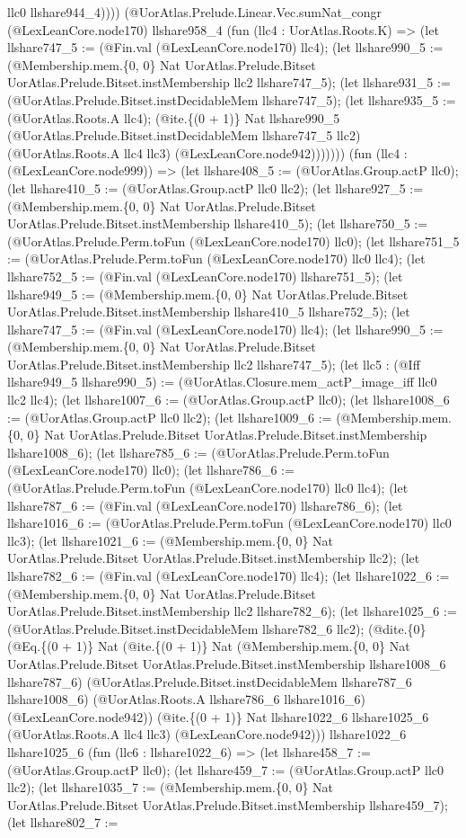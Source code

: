 \documentclass[11pt]{article}
\begin{document}
llc0 llshare944\_4)))) (@UorAtlas.Prelude.Linear.Vec.sumNat\_congr (@LexLeanCore.node170) llshare958\_4 (fun (llc4 : UorAtlas.Roots.K) => (let llshare747\_5 := (@Fin.val (@LexLeanCore.node170) llc4); (let llshare990\_5 := (@Membership.mem.\{0, 0\} Nat UorAtlas.Prelude.Bitset UorAtlas.Prelude.Bitset.instMembership llc2 llshare747\_5); (let llshare931\_5 := (@UorAtlas.Prelude.Bitset.instDecidableMem llshare747\_5); (let llshare935\_5 := (@UorAtlas.Roots.A llc4); (@ite.\{(0 + 1)\} Nat llshare990\_5 (@UorAtlas.Prelude.Bitset.instDecidableMem llshare747\_5 llc2) (@UorAtlas.Roots.A llc4 llc3) (@LexLeanCore.node942))))))) (fun (llc4 : (@LexLeanCore.node999)) => (let llshare408\_5 := (@UorAtlas.Group.actP llc0); (let llshare410\_5 := (@UorAtlas.Group.actP llc0 llc2); (let llshare927\_5 := (@Membership.mem.\{0, 0\} Nat UorAtlas.Prelude.Bitset UorAtlas.Prelude.Bitset.instMembership llshare410\_5); (let llshare750\_5 := (@UorAtlas.Prelude.Perm.toFun (@LexLeanCore.node170) llc0); (let llshare751\_5 := (@UorAtlas.Prelude.Perm.toFun (@LexLeanCore.node170) llc0 llc4); (let llshare752\_5 := (@Fin.val (@LexLeanCore.node170) llshare751\_5); (let llshare949\_5 := (@Membership.mem.\{0, 0\} Nat UorAtlas.Prelude.Bitset UorAtlas.Prelude.Bitset.instMembership llshare410\_5 llshare752\_5); (let llshare747\_5 := (@Fin.val (@LexLeanCore.node170) llc4); (let llshare990\_5 := (@Membership.mem.\{0, 0\} Nat UorAtlas.Prelude.Bitset UorAtlas.Prelude.Bitset.instMembership llc2 llshare747\_5); (let llc5 : (@Iff llshare949\_5 llshare990\_5) := (@UorAtlas.Closure.mem\_actP\_image\_iff llc0 llc2 llc4); (let llshare1007\_6 := (@UorAtlas.Group.actP llc0); (let llshare1008\_6 := (@UorAtlas.Group.actP llc0 llc2); (let llshare1009\_6 := (@Membership.mem.\{0, 0\} Nat UorAtlas.Prelude.Bitset UorAtlas.Prelude.Bitset.instMembership llshare1008\_6); (let llshare785\_6 := (@UorAtlas.Prelude.Perm.toFun (@LexLeanCore.node170) llc0); (let llshare786\_6 := (@UorAtlas.Prelude.Perm.toFun (@LexLeanCore.node170) llc0 llc4); (let llshare787\_6 := (@Fin.val (@LexLeanCore.node170) llshare786\_6); (let llshare1016\_6 := (@UorAtlas.Prelude.Perm.toFun (@LexLeanCore.node170) llc0 llc3); (let llshare1021\_6 := (@Membership.mem.\{0, 0\} Nat UorAtlas.Prelude.Bitset UorAtlas.Prelude.Bitset.instMembership llc2); (let llshare782\_6 := (@Fin.val (@LexLeanCore.node170) llc4); (let llshare1022\_6 := (@Membership.mem.\{0, 0\} Nat UorAtlas.Prelude.Bitset UorAtlas.Prelude.Bitset.instMembership llc2 llshare782\_6); (let llshare1025\_6 := (@UorAtlas.Prelude.Bitset.instDecidableMem llshare782\_6 llc2); (@dite.\{0\} (@Eq.\{(0 + 1)\} Nat (@ite.\{(0 + 1)\} Nat (@Membership.mem.\{0, 0\} Nat UorAtlas.Prelude.Bitset UorAtlas.Prelude.Bitset.instMembership llshare1008\_6 llshare787\_6) (@UorAtlas.Prelude.Bitset.instDecidableMem llshare787\_6 llshare1008\_6) (@UorAtlas.Roots.A llshare786\_6 llshare1016\_6) (@LexLeanCore.node942)) (@ite.\{(0 + 1)\} Nat llshare1022\_6 llshare1025\_6 (@UorAtlas.Roots.A llc4 llc3) (@LexLeanCore.node942))) llshare1022\_6 llshare1025\_6 (fun (llc6 : llshare1022\_6) => (let llshare458\_7 := (@UorAtlas.Group.actP llc0); (let llshare459\_7 := (@UorAtlas.Group.actP llc0 llc2); (let llshare1035\_7 := (@Membership.mem.\{0, 0\} Nat UorAtlas.Prelude.Bitset UorAtlas.Prelude.Bitset.instMembership llshare459\_7); (let llshare802\_7 := 
\end{document}
